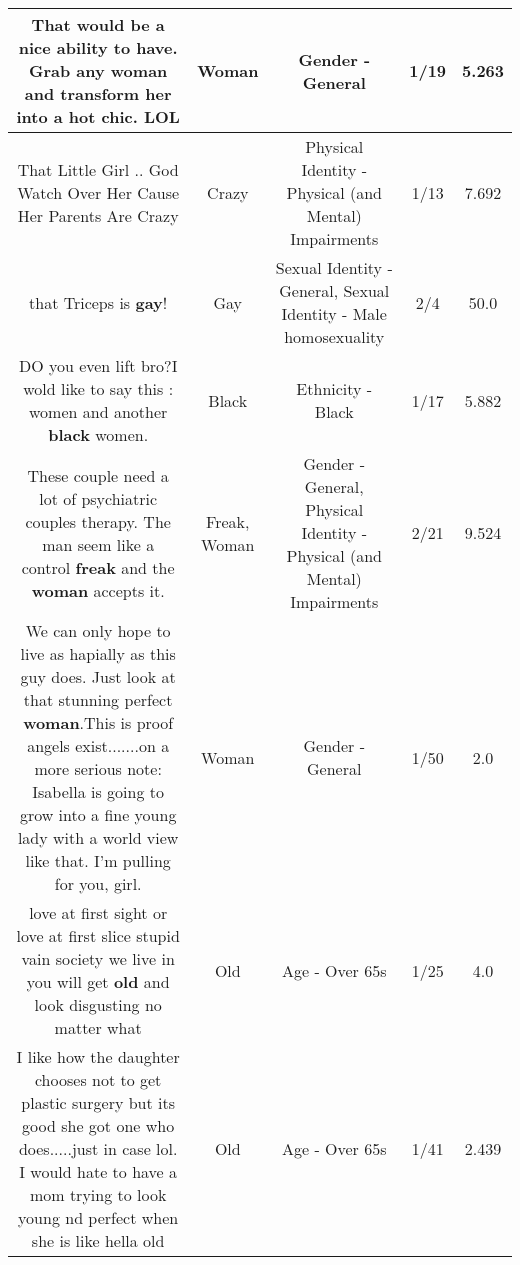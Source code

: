 \documentclass[11pt]{article}
\newlength\mylength
\begin{document}
\begin{center}
\begin{longtable}{|C{.65\mylength}|C{.30\mylength}|C{.12\mylength}|C{.12\mylength}|C{.12\mylength}|}
  \small That would be a nice ability to have. Grab any \textbf{woman} and transform her into a hot chic. LOL\normalsize   & Woman & Gender - General & 1/19 & 5.263 \\  \hline
  \small That Little Girl .. God Watch Over Her Cause Her Parents Are Crazy\normalsize   & Crazy & Physical Identity - Physical (and Mental) Impairments & 1/13 & 7.692 \\  \hline
  \small that Triceps is \textbf{g\textbf{ay}}!\normalsize   & Gay & Sexual Identity - General, Sexual Identity - Male homosexuality & 2/4 & 50.0 \\  \hline
  \small DO you even lift bro?I wold like to say this : women and another \textbf{black} women.\normalsize   & Black & Ethnicity - Black & 1/17 & 5.882 \\  \hline
  \small These couple need a lot of psychiatric couples therapy. The man seem like a control \textbf{freak} and the \textbf{woman} accepts it.\normalsize   & Freak, Woman & Gender - General, Physical Identity - Physical (and Mental) Impairments & 2/21 & 9.524 \\  \hline
  \small We can only hope to live as hapially as this guy does. Just look at that stunning perfect \textbf{woman}.This is proof angels exist.......on a more serious note: Isabella is going to grow into a fine young lady with a world view like that. I'm pulling for you, girl.\normalsize   & Woman & Gender - General & 1/50 & 2.0 \\  \hline
  \small love at first sight or love at first slice stupid vain society we live in you will get \textbf{old} and look disgusting no matter what\normalsize   & Old & Age - Over 65s & 1/25 & 4.0 \\  \hline
  \small I like how the daughter chooses not to get plastic surgery but its good she got one who does.....just in case lol. I would hate to have a mom trying to look young nd perfect when she is like hella old\normalsize   & Old & Age - Over 65s & 1/41 & 2.439 \\  \hline

\end{longtable}
\end{center}
\end{document}
